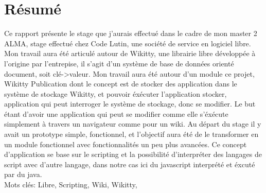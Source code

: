 \section*{Résumé}

Ce rapport présente le stage que j'aurais effectué dans le cadre de mon master 2
ALMA, stage effectué chez Code Lutin, une société de service en logiciel libre.
Mon travail aura été articulé autour de Wikitty, une librairie libre 
développée à l'origine par l'entrepise, il s'agit d'un système de base de 
données orienté document, soit clé->valeur. Mon travail aura été autour d'un 
module ce projet, Wikitty Publication dont le concept est de stocker des 
application dans le système de stockage Wikitty, et pouvoir éxécuter l'application
stocker, application qui peut interroger le système de stockage, donc se modifier.
Le but étant d'avoir une application qui peut se modifier comme elle s'éxécute
simplement à travers un navigateur comme pour un wiki. Au départ du stage il 
y avait un prototype simple, fonctionnel, et l'objectif aura été de le 
transformer en un module fonctionnel avec fonctionnalités un peu plus avancées.
Ce concept d'application se base sur le scripting et la possibilité d'interpréter
des langages de script avec d'autre langage, dans notre cas ici du javascript
interprété et éxcuté par du java.\\

Mots clés: Libre, Scripting, Wiki, Wikitty, 





